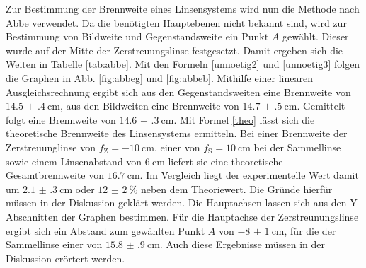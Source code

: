 Zur Bestimmung der Brennweite eines Linsensystems wird nun die Methode nach Abbe verwendet. Da die benötigten Hauptebenen nicht bekannt sind, wird zur Bestimmung von Bildweite und Gegenstandsweite ein Punkt $A$ gewählt. Dieser wurde auf der Mitte der Zerstreuungslinse festgesetzt. Damit ergeben sich die Weiten in Tabelle \ref{tab:abbe}. Mit den Formeln \eqref{unnoetig2} und \eqref{unnoetig3} folgen die Graphen in Abb. \ref{fig:abbeg} und \ref{fig:abbeb}. Mithilfe einer linearen Ausgleichsrechnung ergibt sich aus den Gegenstandsweiten eine Brennweite von $\SI{14.5(4)}{\centi\meter}$, aus den Bildweiten eine Brennweite von $\SI{14.7(5)}{\centi\meter}$.
Gemittelt folgt eine Brennweite von $\SI{14.6(3)}{\centi\meter}$. Mit Formel \eqref{theo} lässt sich die theoretische Brennweite des Linsensystems ermitteln.
Bei einer Brennweite der Zerstreuunglinse von $f_\text{Z} = \SI{-10}{\centi\meter}$, einer von $f_\text{S} = \SI{10}{\centi\meter}$ bei der Sammellinse sowie einem Linsenabstand von $\SI{6}{\centi\meter}$ liefert sie eine theoretische Gesamtbrennweite von $\SI{16.7}{\centi\meter}$. Im Vergleich liegt der experimentelle Wert damit um $\SI{2.1(3)}{\centi\meter}$ oder $\SI{12(2)}{\percent}$ neben dem Theoriewert. Die Gründe hierfür müssen in der Diskussion geklärt werden.
 Die Hauptachsen lassen sich aus den Y-Abschnitten der Graphen bestimmen.
 Für die Hauptachse der Zerstreunungslinse ergibt sich ein Abstand zum gewählten Punkt $A$ von $\SI{-8(1)}{\centi\meter}$, für die der Sammellinse einer von $\SI{15.8(9)}{\centi\meter}$. Auch diese Ergebnisse müssen in der Diskussion erörtert werden.
